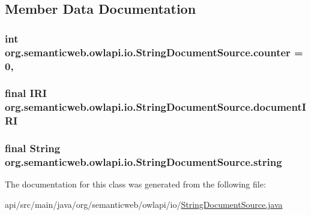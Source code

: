 \subsection{Member Data Documentation}
\hypertarget{classorg_1_1semanticweb_1_1owlapi_1_1io_1_1_string_document_source_a2546adf549b1e18eb3fa8829b5e86a50}{
\subsubsection[{counter}]{\setlength{\rightskip}{0pt plus 5cm}int org.\-semanticweb.\-owlapi.\-io.\-String\-Document\-Source.\-counter = 0\hspace{0.3cm}{\ttfamily [static]}, {\ttfamily [private]}}}\label{classorg_1_1semanticweb_1_1owlapi_1_1io_1_1_string_document_source_a2546adf549b1e18eb3fa8829b5e86a50}
\hypertarget{classorg_1_1semanticweb_1_1owlapi_1_1io_1_1_string_document_source_a8cdc50ee5f4be1700eb905ea32afd79c}{
\subsubsection[{document\-I\-R\-I}]{\setlength{\rightskip}{0pt plus 5cm}final {\bf I\-R\-I} org.\-semanticweb.\-owlapi.\-io.\-String\-Document\-Source.\-document\-I\-R\-I\hspace{0.3cm}{\ttfamily [private]}}}\label{classorg_1_1semanticweb_1_1owlapi_1_1io_1_1_string_document_source_a8cdc50ee5f4be1700eb905ea32afd79c}
\hypertarget{classorg_1_1semanticweb_1_1owlapi_1_1io_1_1_string_document_source_a12c815ec709513d123caed5ca98039bd}{
\subsubsection[{string}]{\setlength{\rightskip}{0pt plus 5cm}final String org.\-semanticweb.\-owlapi.\-io.\-String\-Document\-Source.\-string\hspace{0.3cm}{\ttfamily [private]}}}\label{classorg_1_1semanticweb_1_1owlapi_1_1io_1_1_string_document_source_a12c815ec709513d123caed5ca98039bd}


The documentation for this class was generated from the following file\-:\begin{DoxyCompactItemize}
\item 
api/src/main/java/org/semanticweb/owlapi/io/\hyperlink{_string_document_source_8java}{String\-Document\-Source.\-java}\end{DoxyCompactItemize}
